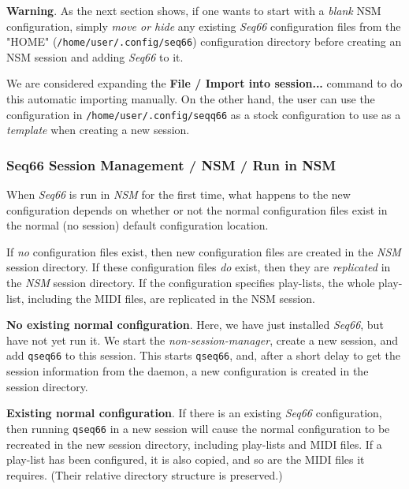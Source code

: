    \textbf{Warning}.
   As the next section shows, if one wants to start with a
   \textsl{blank} NSM configuration,
   simply \textsl{move or hide}
   any existing \textsl{Seq66} configuration files from the
   "HOME" (\texttt{/home/user/.config/seq66})
   configuration directory before
   creating an NSM session and adding \textsl{Seq66} to it.

   We are considered expanding the \textbf{File / Import into session...}
   command to do this automatic importing manually.
   On the other hand, the user can use the configuration
   in \texttt{/home/user/.config/seqq66} as a stock configuration
   to use as a \textsl{template} when creating a new session.

\subsubsection{Seq66 Session Management / NSM / Run in NSM}
\label{subsec:sessions_nsm_first_run_in_nsm}

   When \textsl{Seq66} is run in \textsl{NSM} for the first time,
   what happens to the new configuration depends on whether or not 
   the normal configuration files exist in the normal (no session)
   default configuration location.

   If \textsl{no} configuration files exist,
   then new configuration files are created
   in the \textsl{NSM} session directory.
   If these configuration files \textsl{do} exist,
   then they are \textsl{replicated} in the \textsl{NSM} session directory.
   If the configuration specifies play-lists, the whole play-list, including
   the MIDI files, are replicated in the NSM session.

   \textbf{No existing normal configuration}.
   Here, we have just installed \textsl{Seq66}, but have not
   yet run it.  We start the \textsl{non-session-manager}, create a new session,
   and add \texttt{qseq66} to this session.  This starts \texttt{qseq66}, and,
   after a short delay to get the session information from the daemon, a new
   configuration is created in the session directory.

   \textbf{Existing normal configuration}.
   If there is an existing \textsl{Seq66} configuration,
   then running \texttt{qseq66} in a new
   session will cause the normal configuration to be recreated in the new
   session directory, including play-lists and MIDI files.
   If a play-list has been configured, it is also
   copied, and so are the MIDI files it requires. (Their relative directory
   structure is preserved.)

